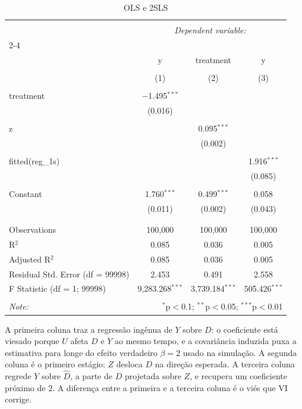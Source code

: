 \documentclass[
]{article}
\begin{document}
\begin{table}[!htbp] \centering 
  \caption{OLS e 2SLS} 
  \label{} 
\begin{tabular}{@{\extracolsep{5pt}}lccc} 
\\[-1.8ex]\hline 
\hline \\[-1.8ex] 
 & \multicolumn{3}{c}{\textit{Dependent variable:}} \\ 
\cline{2-4} 
\\[-1.8ex] & y & treatment & y \\ 
\\[-1.8ex] & (1) & (2) & (3)\\ 
\hline \\[-1.8ex] 
 treatment & $-$1.495$^{***}$ &  &  \\ 
  & (0.016) &  &  \\ 
  & & & \\ 
 z &  & 0.095$^{***}$ &  \\ 
  &  & (0.002) &  \\ 
  & & & \\ 
 fitted(reg\_1s) &  &  & 1.916$^{***}$ \\ 
  &  &  & (0.085) \\ 
  & & & \\ 
 Constant & 1.760$^{***}$ & 0.499$^{***}$ & 0.058 \\ 
  & (0.011) & (0.002) & (0.043) \\ 
  & & & \\ 
\hline \\[-1.8ex] 
Observations & 100,000 & 100,000 & 100,000 \\ 
R$^{2}$ & 0.085 & 0.036 & 0.005 \\ 
Adjusted R$^{2}$ & 0.085 & 0.036 & 0.005 \\ 
Residual Std. Error (df = 99998) & 2.453 & 0.491 & 2.558 \\ 
F Statistic (df = 1; 99998) & 9,283.268$^{***}$ & 3,739.184$^{***}$ & 505.426$^{***}$ \\ 
\hline 
\hline \\[-1.8ex] 
\textit{Note:}  & \multicolumn{3}{r}{$^{*}$p$<$0.1; $^{**}$p$<$0.05; $^{***}$p$<$0.01} \\ 
\end{tabular} 
\end{table}

A primeira coluna traz a regressão ingênua de \(Y\) sobre \(D\): o coeficiente está viesado porque \(U\) afeta \(D\) e \(Y\) ao mesmo tempo, e a covariância induzida puxa a estimativa para longe do efeito verdadeiro \(\beta = 2\) usado na simulação. A segunda coluna é o primeiro estágio: \(Z\) desloca \(D\) na direção esperada. A terceira coluna regrede \(Y\) sobre \(\hat{D}\), a parte de \(D\) projetada sobre \(Z\), e recupera um coeficiente próximo de \(2\). A diferença entre a primeira e a terceira coluna é o viés que VI corrige.
\end{document}
